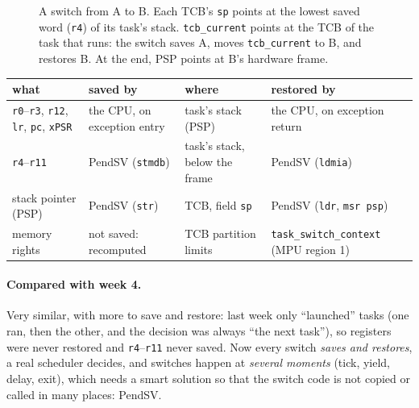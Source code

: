 \begin{figure}[h]
    \caption{A switch from A to B. Each TCB's \texttt{sp} points at the lowest saved word (\texttt{r4}) of its task's stack. \texttt{tcb\_current} points at the TCB of the task that runs: the switch saves A, moves \texttt{tcb\_current} to B, and restores B. At the end, PSP points at B's hardware frame.}
\end{figure}

\begin{center}
\begin{tabular}{l l l l}
    \hline
    \textbf{what} & \textbf{saved by} & \textbf{where} & \textbf{restored by} \\
    \hline
    \texttt{r0}--\texttt{r3}, \texttt{r12}, \texttt{lr}, \texttt{pc}, \texttt{xPSR} & the CPU, on exception entry & task's stack (PSP) & the CPU, on exception return \\
    \texttt{r4}--\texttt{r11} & PendSV (\texttt{stmdb}) & task's stack, below the frame & PendSV (\texttt{ldmia}) \\
    stack pointer (PSP) & PendSV (\texttt{str}) & TCB, field \texttt{sp} & PendSV (\texttt{ldr}, \texttt{msr psp}) \\
    memory rights & not saved: recomputed & TCB partition limits & \texttt{task\_switch\_context} (MPU region 1) \\
    \hline
\end{tabular}
\end{center}

\paragraph{Compared with week 4.} Very similar, with more to save and restore: last week only ``launched'' tasks (one ran, then the other, and the decision was always ``the next task''), so registers were never restored and \texttt{r4}--\texttt{r11} never saved. Now every switch \emph{saves and restores}, a real scheduler decides, and switches happen at \emph{several moments} (tick, yield, delay, exit), which needs a smart solution so that the switch code is not copied or called in many places: PendSV.

